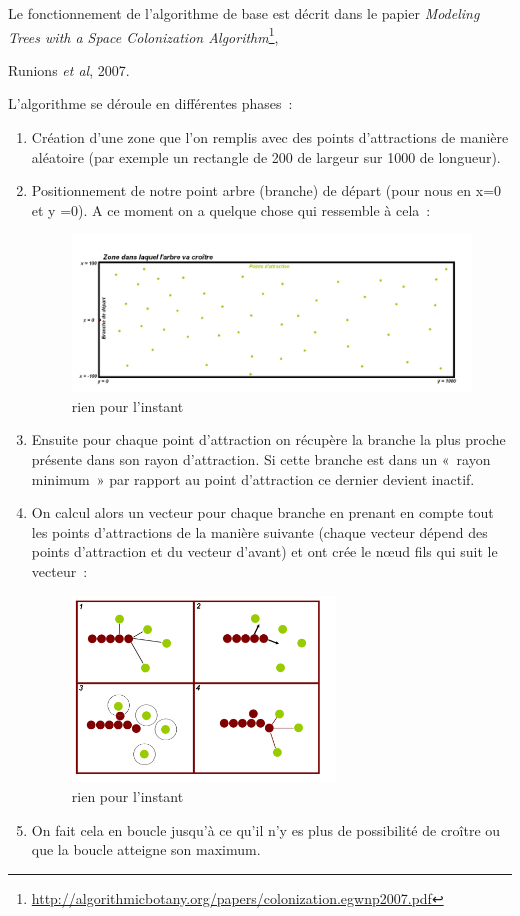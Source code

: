 \documentclass[a4paper]{article}
\begin{document}
		Le fonctionnement de l’algorithme de base est décrit dans le papier \emph{Modeling Trees with a Space Colonization Algorithm}\footnote{\url{http://algorithmicbotany.org/papers/colonization.egwnp2007.pdf}}, {Runions \emph{et al}, 2007.
	
		L’algorithme se déroule en différentes  phases :
		\begin{enumerate}
			\item Création d’une zone que l’on remplis avec des points d’attractions de manière aléatoire (par exemple un rectangle de 200 de largeur sur 1000 de longueur). 
			\item Positionnement de notre point arbre (branche) de départ (pour nous en x=0 et y =0).
			A ce moment on a quelque chose qui ressemble à cela :
			\begin{figure}[!h]
				\centering
				\includegraphics[width=11cm]{sc.jpg}
				\caption{rien pour l'instant}
			\end{figure}
			\item Ensuite pour chaque point d’attraction on récupère la branche la plus proche présente dans son rayon d’attraction. Si cette branche est dans un « rayon minimum » par rapport au point d’attraction ce dernier devient inactif.

			\item On calcul alors un vecteur pour chaque branche en prenant en compte tout les points d’attractions de la manière suivante (chaque vecteur dépend des points d’attraction et du vecteur d’avant) et ont crée le nœud fils qui suit le vecteur : 
			\begin{figure}[!h]
				\centering
				\includegraphics[width=7cm]{sc2.jpg}
				\caption{rien pour l'instant}
			\end{figure}
			\item On fait cela en boucle jusqu’à ce qu’il n’y es plus de possibilité de croître ou que la boucle atteigne son maximum.
		\end{enumerate}


}
\end{document}
